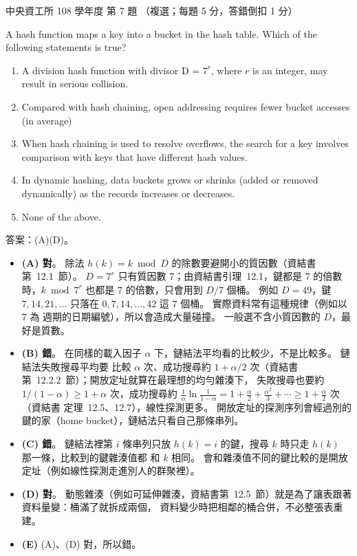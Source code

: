 \begin{pastexam}[label={px:ncu-108-dsa-07}]{中央資工所 108 學年度 第 7 題}
（複選；每題 5 分，答錯倒扣 1 分）

A hash function maps a key into a bucket in the hash table. Which of the following statements is true?
\begin{enumerate}[label=(\Alph*)]
\item A division hash function with divisor D = $7^r$, where $r$ is an integer, may result in serious collision.
\item Compared with hash chaining, open addressing requires fewer bucket accesses (in average)
\item When hash chaining is used to resolve overflows, the search for a key involves comparison with
keys that have different hash values.
\item In dynamic hashing, data buckets grows or shrinks (added or removed dynamically) as the records
increases or decreases.
\item None of the above.
\end{enumerate}
\end{pastexam}

\begin{pastsoln}
答案：(A)(D)。

\begin{itemize}
\item \textbf{(A) 對}。 除法 $h(k) = k \bmod D$ 的除數要避開小的質因數（資結書第~12.1~節）。 $D = 7^r$ 只有質因數
$7$；由資結書引理~12.1，鍵都是 $7$ 的倍數時，$k \bmod 7^r$ 也都是 $7$ 的倍數，只會用到 $D/7$ 個桶。 例如
$D = 49$，鍵 $7, 14, 21, \ldots$ 只落在 $0, 7, 14, \ldots, 42$ 這 $7$ 個桶。 實際資料常有這種規律（例如以 $7$ 為
週期的日期編號），所以會造成大量碰撞。 一般選不含小質因數的 $D$，最好是質數。
\item \textbf{(B) 錯}。 在同樣的載入因子 $\alpha$ 下，鏈結法平均看的比較少，不是比較多。 鏈結法失敗搜尋平均要
比較 $\alpha$ 次、成功搜尋約 $1 + \alpha/2$ 次（資結書第~12.2.2~節）；開放定址就算在最理想的均勻雜湊下，
失敗搜尋也要約 $1/(1 - \alpha) \ge 1 + \alpha$ 次，成功搜尋約
$\frac{1}{\alpha}\ln\frac{1}{1 - \alpha} = 1 + \frac{\alpha}{2} + \frac{\alpha^2}{3} + \cdots \ge 1 + \frac{\alpha}{2}$ 次（資結書
定理~12.5、12.7），線性探測更多。 開放定址的探測序列會經過別的鍵的家（home bucket），鏈結法只看自己那條串列。
\item \textbf{(C) 錯}。 鏈結法裡第 $i$ 條串列只放 $h(k) = i$ 的鍵，搜尋 $k$ 時只走 $h(k)$ 那一條，比較到的鍵雜湊值都
和 $k$ 相同。 會和雜湊值不同的鍵比較的是開放定址（例如線性探測走進別人的群聚裡）。
\item \textbf{(D) 對}。 動態雜湊（例如可延伸雜湊，資結書第~12.5~節）就是為了讓表跟著資料量變：桶滿了就拆成兩個，
資料變少時把相鄰的桶合併，不必整張表重建。
\item \textbf{(E)} (A)、(D) 對，所以錯。
\end{itemize}
\end{pastsoln}
